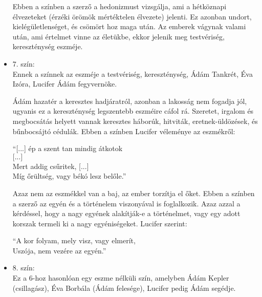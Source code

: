 \documentclass[]{article}
\begin{document}
\begin{itemize}
	 		Ebben a színben a szerző a hedonizmust vizsgálja, ami a hétköznapi élvezeteket (érzéki örömök mértéktelen élvezete) jelenti. Ez azonban undort, kielégületlenséget, és csömört hoz maga után. Az emberek vágynak valami után, ami értelmet vinne az életükbe, ekkor jelenik meg testvériség, kereszténység eszméje.
 		\item 7. szín:\\
 			Ennek a színnek az eszméje a testvériség, kereszténység, Ádám Tankrét, Éva Izóra, Lucifer Ádám fegyvernöke.
 			
 			Ádám hazatér a keresztes hadjáratról, azonban a lakosság nem fogadja jól, ugyanis ez a kereszténység legszentebb eszméire cáfol rá. Szeretet, irgalom és megbocsátás helyett vannak keresztes háborúk, hitviták, eretnek-üldözések, és bűnbocsájtó cédulák. Ebben a színben Lucifer véleménye az eszmékről:
 			\begin{displayquote}
 				\enquote{[...] ép a szent tan mindig átkotok\\
 				$\textrm{[...]}$\\
 				Mert addig csűritek, [...]\\
 				Míg őrültség, vagy békó lesz belőle.}
 			\end{displayquote}
 			Azaz nem az eszmékkel van a baj, az ember torzítja el őket. Ebben a színben a szerző az egyén és a történelem viszonyával is foglalkozik. Azaz azzal a kérdéssel, hogy a nagy egyének alakítják-e a történelmet, vagy egy adott korszak termeli ki a nagy egyéniségeket. Lucifer szerint:
 			\begin{displayquote}
 				\enquote{A kor folyam, mely visz, vagy elmerít,\\
 				Uszója, nem vezére az egyén.}
 			\end{displayquote}
 		\item 8. szín:\\
 			Ez a 6-hoz hasonlóan egy eszme nélküli szín, amelyben Ádám Kepler (csillagász), Éva Borbála (Ádám felesége), Lucifer pedig Ádám segédje.
 			

\end{itemize}
\end{document}
